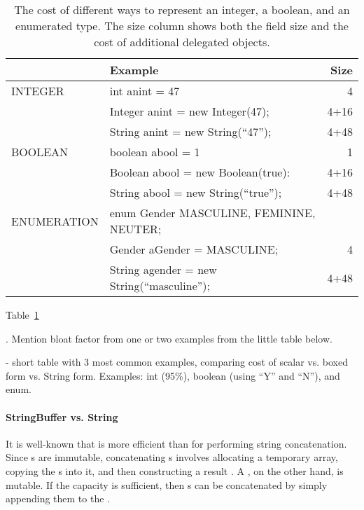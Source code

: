 \begin{table}
  \centering
\begin{tabular}{llr} \toprule \toprule
& Example & Size \\ \midrule \midrule
INTEGER & int anint = 47 & 4 \\
\midrule
& Integer anint = new Integer(47); & 4+16  \\
\midrule
& String anint = new String(``47''); & 4+48 \\
\midrule
\midrule
BOOLEAN & boolean abool = 1 & 1\\
\midrule
& Boolean abool = new Boolean(true): & 4+16 \\
\midrule
& String abool = new String(``true''); & 4+48 \\
\midrule \midrule
ENUMERATION & enum Gender {MASCULINE, FEMININE, NEUTER}; &\\
& Gender aGender = MASCULINE; & 4 \\
\midrule
& String agender = new String(``masculine''); & 4+48 \\
\bottomrule \bottomrule
\end{tabular}

\caption{The cost of different ways to represent an integer, a boolean, and an
enumerated type. The size column shows both the field size and the cost of
additional delegated objects.}
\label{tab:data-sizes}
\end{table}

Table~\ref{tab:data-sizes}

.  Mention
bloat factor from one or two examples from the little table below.




- short table with 3 most common examples, comparing cost of scalar
vs. boxed form vs. String form.  Examples: int (95\%), boolean (using ``Y''
and ``N''), and enum. 

\paragraph{StringBuffer vs. String}

It is well-known that  is more efficient than
 for performing string concatenation. Since s are
immutable, concatenating s involves allocating a temporary
 array, copying the s into it, and then constructing
a result . A , on the other hand, is mutable.
If the  capacity is sufficient, then s
can be concatenated by simply appending them to the .

